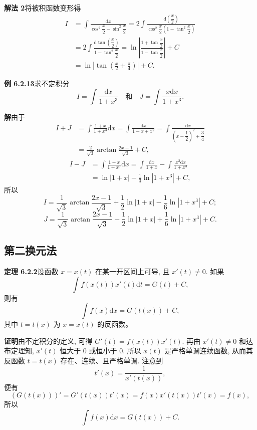 \documentclass[UTF8,12pt,a4paper,fontset=fandol]{ctexart}
\begin{document}
\noindent\textbf{解法 2}\quad 将被积函数变形得
\[
\begin{aligned}
  I
  &=
  \int\frac{\mathrm dx}{\cos^2\dfrac x2-\sin^2\dfrac x2}
  =
  2\int\frac{\mathrm d\left(\dfrac x2\right)}
  {\cos^2\dfrac x2\left(1-\tan^2\dfrac x2\right)}\\
  &=
  2\int\frac{\mathrm d\tan\left(\dfrac x2\right)}
  {1-\tan^2\dfrac x2}
  =
  \ln\left|\frac{1+\tan\dfrac x2}{1-\tan\dfrac x2}\right|+C\\
  &=
  \ln\left|\tan\left(\frac x2+\frac\pi4\right)\right|+C.
\end{aligned}
\]

\noindent\textbf{例 6.2.13}\quad 求不定积分
\[
  I=\int\frac{\mathrm dx}{1+x^3}
  \quad\text{和}\quad
  J=\int\frac{x\mathrm dx}{1+x^3}.
\]

\noindent\textbf{解}\quad 由于
\[
\begin{aligned}
  I+J
  &=
  \int\frac{1+x}{1+x^3}\mathrm dx
  =
  \int\frac{\mathrm dx}{1-x+x^2}
  =
  \int\frac{\mathrm dx}{\left(x-\dfrac12\right)^2+\dfrac34}\\
  &=
  \frac2{\sqrt3}\arctan\frac{2x-1}{\sqrt3}+C,
\end{aligned}
\]
\[
\begin{aligned}
  I-J
  &=
  \int\frac{1-x}{1+x^3}\mathrm dx
  =
  \int\frac{\mathrm dx}{1+x}
  -
  \int\frac{x^2\mathrm dx}{1+x^3}\\
  &=
  \ln|1+x|-\frac13\ln|1+x^3|+C,
\end{aligned}
\]
所以
\[
  I=
  \frac1{\sqrt3}\arctan\frac{2x-1}{\sqrt3}
  +
  \frac12\ln|1+x|-\frac16\ln|1+x^3|+C;
\]
\[
  J=
  \frac1{\sqrt3}\arctan\frac{2x-1}{\sqrt3}
  -
  \frac12\ln|1+x|+\frac16\ln|1+x^3|+C.
\]

\subsection{第二换元法}

\noindent\textbf{定理 6.2.2}\quad 设函数 $x=x(t)$ 在某一开区间上可导, 且 $x'(t)\ne0$. 如果
\[
  \int f(x(t))x'(t)\mathrm dt=G(t)+C,
\]
则有
\[
  \int f(x)\mathrm dx=G(t(x))+C,
\]
其中 $t=t(x)$ 为 $x=x(t)$ 的反函数。

\noindent\textbf{证明}\quad 由不定积分的定义, 可得 $G'(t)=f(x(t))x'(t)$. 再由 $x'(t)\ne0$ 和达布定理知, $x'(t)$ 恒大于 $0$ 或恒小于 $0$. 所以 $x(t)$ 是严格单调连续函数, 从而其反函数 $t=t(x)$ 存在、连续、且严格单调. 注意到
\[
  t'(x)=\frac1{x'(t(x))},
\]
便有
\[
  (G(t(x)))'=G'(t(x))t'(x)=f(x)x'(t(x))t'(x)=f(x),
\]
所以
\[
  \int f(x)\mathrm dx=G(t(x))+C.
\]
\end{document}
